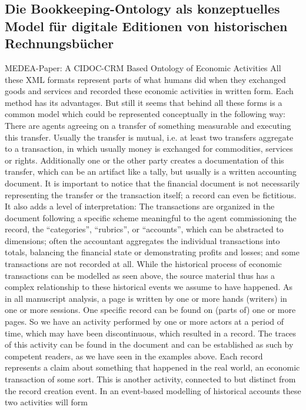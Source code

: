 \documentclass[12pt,a4paper]{article}
\begin{document}
\subsection{Die Bookkeeping-Ontology als konzeptuelles Model für digitale Editionen von historischen Rechnungsbücher}
\label{BK}

MEDEA-Paper:
A CIDOC-CRM Based Ontology of Economic Activities
All these XML formats represent parts of what humans did when they exchanged goods and
services and recorded these economic activities in written form. Each method has its advantages.
But still it seems that behind all these forms is a common model which could be represented
conceptually in the following way: There are agents agreeing on a transfer of something
measurable and executing this transfer. Usually the transfer is mutual, i.e. at least two transfers
aggregate to a transaction, in which usually money is exchanged for commodities, services or
rights. Additionally one or the other party creates a documentation of this transfer, which can be
an artifact like a tally, but usually is a written accounting document. It is important to notice that
the financial document is not necessarily representing the transfer or the transaction itself; a
record can even be fictitious. It also adds a level of interpretation: The transactions are organized
in the document following a specific scheme meaningful to the agent commissioning the record,
the “categories”, “rubrics”, or “accounts”, which can be abstracted to dimensions; often the
accountant aggregates the individual transactions into totals, balancing the financial state or
demonstrating profits and losses; and some transactions are not recorded at all.
While the historical process of economic transactions can be modelled as seen above, the source
material thus has a complex relationship to these historical events we assume to have happened.
As in all manuscript analysis, a page is written by one or more hands (writers) in one or more
sessions. One specific record can be found on (parts of) one or more pages. So we have an
activity performed by one or more actors at a period of time, which may have been
discontinuous, which resulted in a record. The traces of this activity can be found in the
document and can be established as such by competent readers, as we have seen in the examples
above.
Each record represents a claim about something that happened in the real world, an economic
transaction of some sort. This is another activity, connected to but distinct from the record
creation event. In an event-based modelling of historical accounts these two activities will form
\end{document}

